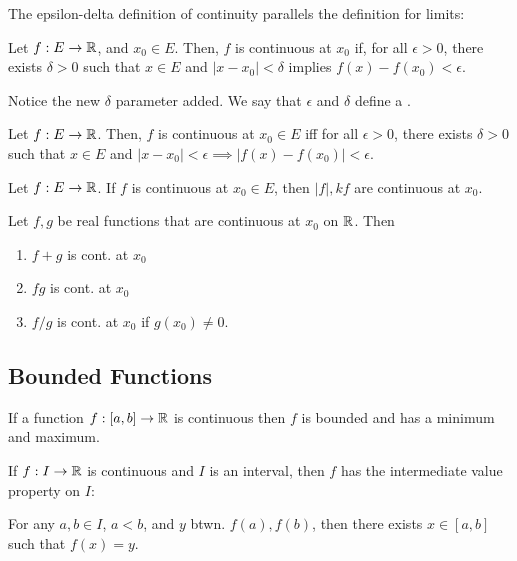 \documentclass{book}
\begin{document}
The epsilon-delta definition of continuity parallels the definition for limits:
\begin{defn}
    Let $f : E \to \mathbb{R}$, and $x_0 \in E$. Then, $f$ is continuous at $x_0$ if, for all $\epsilon > 0$, there exists $\delta > 0$ such that $x \in E$ and $|x - x_0| < \delta$ implies $f(x) - f(x_0) < \epsilon$.
\end{defn}

Notice the new $\delta$ parameter added. We say that $\epsilon$ and $\delta$ define a .

\begin{thm}
    Let $f: E \to \mathbb{R}$. Then, $f$ is continuous at $x_0 \in E$ iff for all $\epsilon > 0$, there exists $\delta > 0$ such that $x \in E$ and $|x - x_0| < \epsilon \implies |f(x) - f(x_0)| < \epsilon$.
\end{thm}

\begin{thm}
    Let $f : E \to \mathbb{R}$.  If $f$ is continuous at $x_0 \in E$, then $|f|, kf$ are continuous at $x_0$.
\end{thm}

\begin{thm}
    Let $f, g$ be real functions that are continuous at $x_0$ on $\mathbb{R}$. Then
    \begin{enumerate}[label=(\roman*)]
        \item $f + g$ is cont. at $x_0$
        \item $fg$ is cont. at $x_0$
        \item $f/g$ is cont. at $x_0$ if $g(x_0) \neq 0$.
    \end{enumerate}
\end{thm}

\subsection{Bounded Functions}
\begin{thm}
    If a function $f : [a, b] \to \mathbb{R}$ is continuous then $f$ is bounded and has a minimum and maximum.
\end{thm}

\begin{thm}
    If $f: I \to \mathbb{R}$ is continuous and $I$ is an interval, then $f$ has the intermediate value property on $I$:

    For any $a, b \in I$, $a < b$, and $y$ btwn. $f(a), f(b)$, then there exists $x \in [a, b]$ such that $f(x) = y$.
\end{thm}
\end{document}
